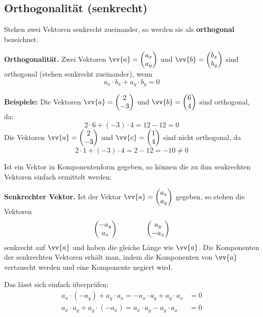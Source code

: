 \subsection{Orthogonalität (senkrecht)}

Stehen zwei Vektoren senkrecht zueinander, so werden sie als \textbf{orthogonal} bezeichnet.

\begin{theorem}
  \textbf{Orthogonalität.} Zwei Vektoren $\vv{a} = \vxy{a_{x},a_{y}}$ und $\vv{b} = \vxy{b_{x},b_{y}}$ sind orthogonal (stehen senkrecht zueinander), wenn
  \[
    a_{x}\cdot b_{x}+a_{y}\cdot b_{y} = 0
  \]
\end{theorem}

\begin{center}
\end{center}

\begin{example}
  \textbf{Beispiele:} Die Vektoren $\vv{a} = \vxy{2,-3}$ und $\vv{b} = \vxy{6,4}$ sind orthogonal, da:
  \[
    2\cdot 6 + (-3)\cdot 4 = 12 - 12 = 0
  \]
  Die Vektoren $\vv{a} = \vxy{2,-3}$ und $\vv{c} = \vxy{1,4}$ sind nicht orthogonal, da
  \[
    2\cdot 1 + (-3)\cdot 4 = 2-12 = -10 \ne 0
  \]
\end{example}

Ist ein Vektor in Komponentenform gegeben, so können die zu ihm senkrechten Vektoren einfach ermittelt werden:

\begin{theorem}
  \textbf{Senkrechter Vektor.} Ist der Vektor $\vv{a} = \vxy{a_{x},a_{y}}$ gegeben, so stehen die Vektoren
  \[
    \vxy{-a_{y},a_{x}} \qquad\qquad \vxy{a_{y},-a_{x}}
  \]
  senkrecht auf $\vv{a}$ und haben die gleiche Länge wie $\vv{a}$. Die Komponenten der senkrechten Vektoren erhält man, indem die Komponenten von $\vv{a}$ vertauscht werden und eine Komponente negiert wird.
\end{theorem}
Das lässt sich einfach überprüfen:
\begin{align*}
  a_{x}\cdot(-a_{y})+a_{y}\cdot a_{x} = -a_{x}\cdot a_{y}+a_{y}\cdot a_{x} &= 0 \\
  a_{x}\cdot a_{y}+a_{y}\cdot(-a_{x}) = a_{x}\cdot a_{y}-a_{y}\cdot a_{x} &= 0
\end{align*}

